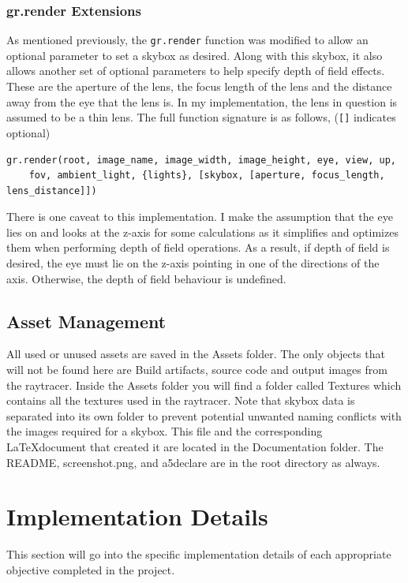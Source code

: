 \documentclass {article}
\begin{document}
\subsubsection{gr.render Extensions}
As mentioned previously, the \texttt{gr.render} function was modified to allow an optional parameter
to set a skybox as desired. Along with this skybox, it also allows another set of optional parameters to
help specify depth of field effects. These are the aperture of the lens, the focus length of the lens
and the distance away from the eye that the lens is. In my implementation, the lens in question is assumed to be a thin lens.
The full function signature is as follows, (\texttt{[]} indicates optional)
\begin{verbatim}
gr.render(root, image_name, image_width, image_height, eye, view, up, 
    fov, ambient_light, {lights}, [skybox, [aperture, focus_length, lens_distance]])
\end{verbatim}
There is one caveat to this implementation. I make the assumption that the eye lies on and looks at
the
z-axis for some calculations as it simplifies and optimizes them when performing depth of
field operations. As a result, if depth of field is desired, the eye must lie on the z-axis pointing
in one of the directions of the axis. Otherwise, the depth of field behaviour is undefined.
\subsection{Asset Management}
All used or unused assets are saved in the Assets folder. The only objects that will
not be found here are Build artifacts, source code and output images from the raytracer.
Inside the Assets folder you will find a folder called Textures which contains all the textures
used in the raytracer. Note that skybox data is separated into its own folder to prevent potential 
unwanted naming conflicts with the images required for a skybox. This file and the corresponding
\LaTeX  document that created it are located in the Documentation folder. The README, screenshot.png, and a5declare
are in the root directory as always.
\section{Implementation Details}
This section will go into the specific implementation details of each appropriate objective
completed in the project.
\end{document}
